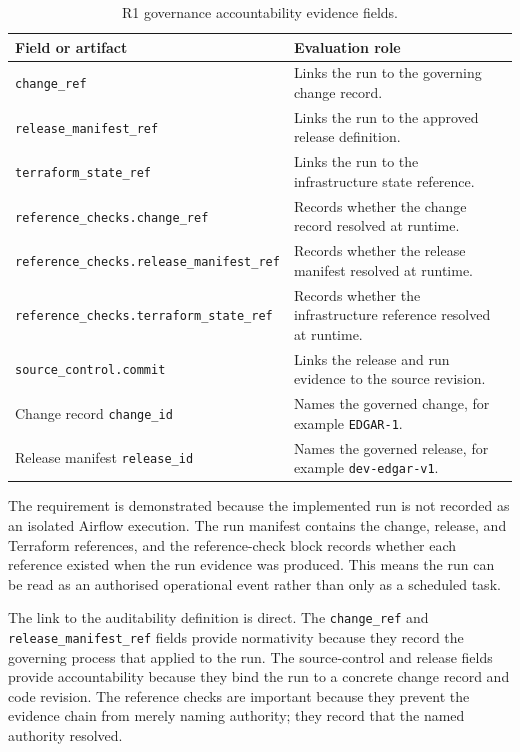 \begin{table}[H]
  \centering
  \caption{R1 governance accountability evidence fields.}
  \label{tab:evaluation-r1-fields}
  \renewcommand{\arraystretch}{1.15}
  \begin{tabularx}{\textwidth}{@{}p{}X@{}}
    \toprule
    \textbf{Field or artifact} & \textbf{Evaluation role} \\
    \midrule
    \texttt{change\_ref} & Links the run to the governing change record. \\
    \texttt{release\_manifest\_ref} & Links the run to the approved release definition. \\
    \texttt{terraform\_state\_ref} & Links the run to the infrastructure state reference. \\
    \texttt{reference\_checks.change\_ref} & Records whether the change record resolved at runtime. \\
    \texttt{reference\_checks.release\_manifest\_ref} & Records whether the release manifest resolved at runtime. \\
    \texttt{reference\_checks.terraform\_state\_ref} & Records whether the infrastructure reference resolved at runtime. \\
    \texttt{source\_control.commit} & Links the release and run evidence to the source revision. \\
    Change record \texttt{change\_id} & Names the governed change, for example \texttt{EDGAR-1}. \\
    Release manifest \texttt{release\_id} & Names the governed release, for example \texttt{dev-edgar-v1}. \\
    \bottomrule
  \end{tabularx}
\end{table}

The requirement is demonstrated because the implemented run is not recorded as
an isolated Airflow execution. The run manifest contains the change, release,
and Terraform references, and the reference-check block records whether each
reference existed when the run evidence was produced. This means the run can be
read as an authorised operational event rather than only as a scheduled task.

The link to the auditability definition is direct. The \texttt{change\_ref} and
\texttt{release\_manifest\_ref} fields provide normativity because they record
the governing process that applied to the run. The source-control and release
fields provide accountability because they bind the run to a concrete change
record and code revision. The reference checks are important because they
prevent the evidence chain from merely naming authority; they record that the
named authority resolved.

